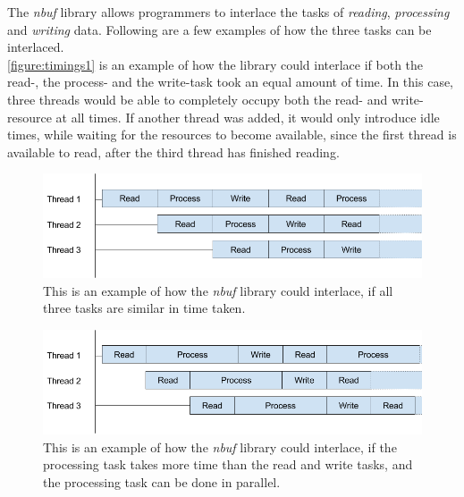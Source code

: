 \documentclass[a4paper]{article}
\newcommand{\nbuf}{\textit{nbuf} }
\begin{document}
The \nbuf library allows programmers to interlace the tasks of \textit{reading}, \textit{processing} and \textit{writing} data. Following are a few examples of how the three tasks can be interlaced.\\

\autoref{figure:timings1} is an example of how the library could interlace if both the read-, the process- and the write-task took an equal amount of time. In this case, three threads would be able to completely occupy both the read- and write-resource at all times. If another thread was added, it would only introduce idle times, while waiting for the resources to become available, since the first thread is available to read, after the third thread has finished reading.\\

\begin{figure}
	\begin{adjustwidth}{-0.5in}{-0.5in}
    \centering
     \includegraphics[scale=0.5]{figures/timings1.png}
  	\caption{This is an example of how the \nbuf library could interlace, if all three tasks are similar in time taken.}
	\label{figure:timings1}
	\end{adjustwidth}
\end{figure}

\begin{figure}
	\begin{adjustwidth}{-0.5in}{-0.5in}
    \centering
     \includegraphics[scale=0.5]{figures/timings2.png}
  	\caption{This is an example of how the \nbuf library could interlace, if the processing task takes more time than the read and write tasks, and the processing task can be done in parallel.}
	\label{figure:timings2}
	\end{adjustwidth}
\end{figure}
\end{document}

